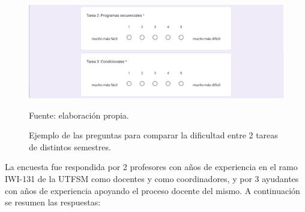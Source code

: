 \documentclass[letterpaper,12pt]{article}
\begin{document}
\begin{figure}[H]
  \centering
  \includegraphics[width=1\textwidth]{figures/formulario2.png}
  \caption{Ejemplo de las preguntas para comparar la dificultad entre 2 tareas de distintos semestres.} Fuente: elaboración propia.
  \label{formulario2}
\end{figure}
La encuesta fue respondida por 2 profesores con años de experiencia en el ramo IWI-131 de la UTFSM como docentes y como coordinadores, y por 3 ayudantes con años de experiencia apoyando el proceso docente del mismo. A continuación se resumen las respuestas:
\end{document}
